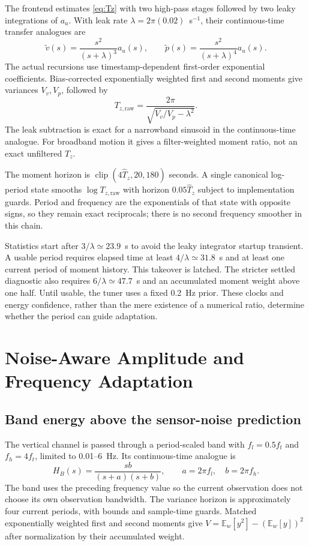 \documentclass[conference]{IEEEtran}
\newcommand{\E}{\mathbb E}
\DeclareMathOperator{\clip}{clip}
\begin{document}
The frontend estimates \cref{eq:Tz} with two high-pass stages followed
by two leaky integrations of $a_u$. With leak rate
$\lambda=2\pi(0.02)$~s$^{-1}$, their continuous-time transfer analogues are
\begin{equation}
 \tilde v(s)=\frac{s^2}{(s+\lambda)^3}a_u(s),\qquad
 \tilde p(s)=\frac{s^2}{(s+\lambda)^4}a_u(s).
 \label{eq:periodfilters}
\end{equation}
The actual recursions use timestamp-dependent first-order exponential
coefficients. Bias-corrected exponentially weighted first and second
moments give variances $V_v,V_p$, followed by
\begin{equation}
 T_{z,\mathrm{raw}}=\frac{2\pi}{\sqrt{V_v/V_p-\lambda^2}}.
 \label{eq:Traw}
\end{equation}
The leak subtraction is exact for a narrowband sinusoid in the
continuous-time analogue. For broadband motion it gives a filter-weighted
moment ratio, not an exact unfiltered $T_z$.

The moment horizon is
$\clip(4\hat T_z,20,180)$ seconds. A single canonical log-period state
smooths $\log T_{z,\mathrm{raw}}$ with horizon $0.05\hat T_z$ subject to
implementation guards. Period and frequency are the exponentials of that
state with opposite signs, so they remain exact reciprocals; there is no
second frequency smoother in this chain.

Statistics start after $3/\lambda\simeq23.9$~s to avoid the leaky
integrator startup transient. A usable period requires elapsed time at
least $4/\lambda\simeq31.8$~s and at least one current period of moment
history. This takeover is latched. The stricter settled diagnostic also
requires $6/\lambda\simeq47.7$~s and an accumulated moment weight above
one half. Until usable, the tuner uses a fixed 0.2~Hz prior. These clocks
and energy confidence, rather than the mere existence of a numerical
ratio, determine whether the period can guide adaptation.

\section{Noise-Aware Amplitude and Frequency Adaptation}
\label{sec:adapt}
\subsection{Band energy above the sensor-noise prediction}
The vertical channel is passed through a period-scaled band with
$f_l=0.5 f_t$ and $f_h=4f_t$, limited to 0.01--6~Hz. Its continuous-time
analogue is
\begin{equation}
 H_B(s)=\frac{s b}{(s+a)(s+b)},\qquad a=2\pi f_l,\quad b=2\pi f_h.
 \label{eq:band}
\end{equation}
The band uses the preceding frequency value so the current observation
does not choose its own observation bandwidth. The variance horizon is
approximately four current periods, with bounds and sample-time guards.
Matched exponentially weighted first and second moments give
$V=\E_w[y^2]-(\E_w[y])^2$ after normalization by their accumulated weight.
\end{document}
